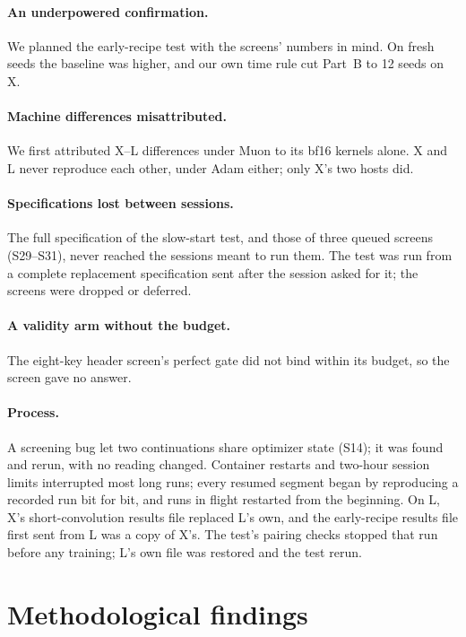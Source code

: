 \documentclass[11pt]{article}
\begin{document}
\paragraph{An underpowered confirmation.} We planned the early-recipe test with the screens' numbers in mind. On fresh seeds the baseline was higher, and our own time rule cut Part~B to 12 seeds on X.

\paragraph{Machine differences misattributed.} We first attributed X--L differences under Muon to its bf16 kernels alone. X and L never reproduce each other, under Adam either; only X's two hosts did.

\paragraph{Specifications lost between sessions.} The full specification of the slow-start test, and those of three queued screens (S29--S31), never reached the sessions meant to run them. The test was run from a complete replacement specification sent after the session asked for it; the screens were dropped or deferred.

\paragraph{A validity arm without the budget.} The eight-key header screen's perfect gate did not bind within its budget, so the screen gave no answer.

\paragraph{Process.} A screening bug let two continuations share optimizer state (S14); it was found and rerun, with no reading changed. Container restarts and two-hour session limits interrupted most long runs; every resumed segment began by reproducing a recorded run bit for bit, and runs in flight restarted from the beginning. On L, X's short-convolution results file replaced L's own, and the early-recipe results file first sent from L was a copy of X's. The test's pairing checks stopped that run before any training; L's own file was restored and the test rerun.

\section{Methodological findings}
\label{sec:method}
\end{document}
